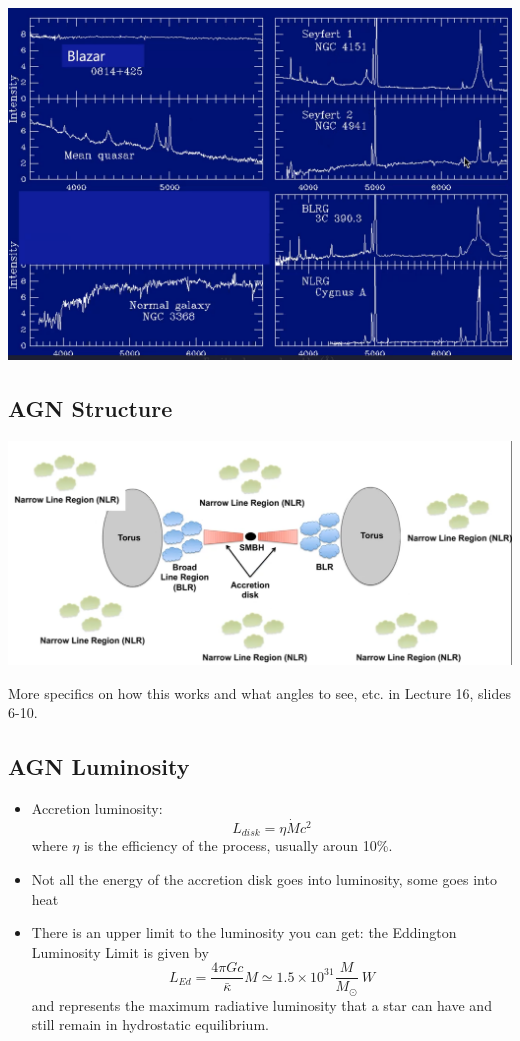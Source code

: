 \documentclass{book}
\begin{document}
\begin{itemize}
\begin{center}
              \includegraphics[height = 0.6 \textwidth]{images/types_agn.png}
          \end{center}
\end{itemize}
\subsection{AGN Structure}
\begin{center}
    \includegraphics[width = \textwidth]{images/agn_structure.png}
\end{center}
More specifics on how this works and what angles to see, etc. in Lecture 16, slides 6-10.
\subsection{AGN Luminosity}
\begin{itemize}
    \item Accretion luminosity:
          \begin{equation*}
              L_{disk} = \eta \dot{M} c^2 \tag{C\&O 28.6}
          \end{equation*}
          where $\eta$ is the efficiency of the process, usually aroun 10\%.
    \item Not all the energy of the accretion disk goes into luminosity, some goes into heat
    \item There is an upper limit to the luminosity you can get: the Eddington Luminosity Limit is given by
          \begin{equation*}
              L_{Ed} = \frac{4 \pi G c}{\bar{\kappa}} M  \simeq 1.5 \times 10^{31} \frac{M}{M_\odot}\ W \tag{10.114}
          \end{equation*}
          and represents the maximum radiative luminosity that a star can have and still remain in hydrostatic equilibrium.
\end{itemize}
\end{document}

